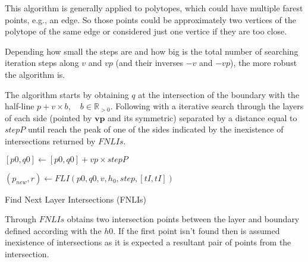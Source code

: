 This algorithm is generally applied to polytopes, which could have multiple farest points, e.g., an edge. So those points could be approximately two vertices of the polytope of the same edge or considered just one vertice if they are too close. \par
Depending how small the steps are and how big is the total number of searching iteration steps along \(v\) and \(vp\) (and their inverses \(-v\) and \(-vp\)), the more robust the algorithm  is.\par
The algorithm starts by obtaining \(q\) at the intersection of the boundary with the half-line \(p + v\times b, \quad b \in \mathbb{R}_{>0}\). Following with a iterative  search through the layers of each side (pointed by \(\mathbf{vp}\) and its symmetric) separated by a distance equal to \(stepP\) until reach the peak of one of the sides indicated by the inexistence of intersections returned by \(FNLIs\).\\


  \begin{algorithm}
    
    $[p0, q0] \gets [p0, q0] + vp \times stepP$ 
    
    
    $(p_{new}, r) \gets FLI(p0, q0, v, h_0, step, [tI, tI])$
        
      
    \caption{Find Next Layer Intersections (FNLIs)} \label{alg:Find_Next_Layer_Intersections}
  \end{algorithm}

  Through \(FNLIs\) obtains two intersection points between the layer and boundary defined according with the  \(h0\). If the first point isn't found then is assumed inexistence of intersections as it is expected a resultant pair of points from the intersection.\\

